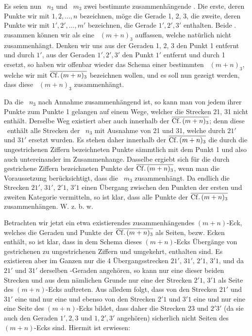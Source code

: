 \documentclass[11pt,a4paper]{article}
\begin{document}
Es seien nun \Cf\ $n_3$ und \Cf\ $m_3$ zwei bestimmte zusammenhängende \Cff. Die erste, deren Punkte wir mit $1,2,\ldots,n$ bezeichnen, möge die Gerade 1, 2, 3, die zweite, deren Punkte wir mit $1',2',\ldots,m'$ bezeichnen, die Gerade $1',2',3'$ enthalten. Beide \Cff. zusammen können wir als eine \Cf\ $(m+n)_3$ auffassen, welche natürlich nicht zusammenhängt. Denken wir uns aus der Geraden 1, 2, 3 den Punkt 1 entfernt und durch $1'$, aus der Geraden $1',2',3'$ den Punkt $1'$ entfernt und durch 1 ersetzt, so haben wir offenbar wieder das Schema einer bestimmten \Cf\ $(m+n)_3$, welche wir mit $\overline{\mathrm{Cf.}\,(m+n)_3}$ bezeichnen wollen, und es soll nun gezeigt werden, dass diese \Cf\ $(m+n)_3$ zusammenhängt.

Da die \Cf\ $n_3$ nach Annahme zusammenhängend ist, so kann man von jedem ihrer Punkte zum Punkte 1 gelangen auf einem Wege, welcher die Strecken 21, 31 nicht enthält. Derselbe Weg existiert aber auch innerhalb der $\overline{\mathrm{Cf.}\,(m+n)_3}$; denn diese \Cf\ enthält alle Strecken der \Cf\ $n_3$ mit Ausnahme von 21 und 31, welche durch $21'$ und $31'$ ersetzt wurden. Es stehen daher innerhalb der $\overline{\mathrm{Cf.}\,(m+n)_3}$ die durch die ungestrichenen Ziffern bezeichneten Punkte sämmtlich mit dem Punkt 1 und also auch untereinander im Zusammenhange. Dasselbe ergiebt sich für die durch gestrichene Ziffern bezeichneten Punkte der $\overline{\mathrm{Cf.}\,(m+n)_3}$, wenn man die Voraussetzung berücksichtigt, dass die \Cf\ $m_3$ zusammenhängt. Da endlich die Strecken $21'$, $31'$, $2'1$, $3'1$ einen Übergang zwischen den Punkten der ersten und zweiten Kategorie vermitteln, so ist klar, dass alle Punkte der $\overline{\mathrm{Cf.}\,(m+n)_3}$ zusammenhängen. W. z. b. w.

Betrachten wir jetzt ein etwa existierendes zusammenhängendes $(m+n)$-Eck, welches die Geraden und Punkte der $\overline{\mathrm{Cf.}\,(m+n)_3}$ als Seiten, bezw. Ecken enthält, so ist klar, dass in dem Schema dieses $(m+n)$-Ecks Übergänge von gestrichenen zu ungestrichenen Ziffern und umgekehrt, enthalten sind. Es existieren aber im Ganzen nur die 4 Übergangsstrecken $21'$, $31'$, $2'1$, $3'1$, und da $21'$ und $31'$ derselben \Cf-Geraden angehören, so kann nur eine dieser beiden Strecken und aus dem nämlichen Grunde nur eine der Strecken $2'1$, $3'1$ als Seite des $(m+n)$-Ecks auftreten. Aus alledem folgt, dass von den Strecken $21'$ und $31'$ eine und nur eine und ebenso von den Strecken $2'1$ und $3'1$ eine und nur eine eine Seite des $(m+n)$-Ecks bildet, dass daher die Strecken 23 und $2'3'$ (da sie auch den Geraden $1',2,3$ und $1,2',3'$ angehören) sicherlich nicht Seiten des $(m+n)$-Ecks sind. Hiermit ist erwiesen:
\end{document}
